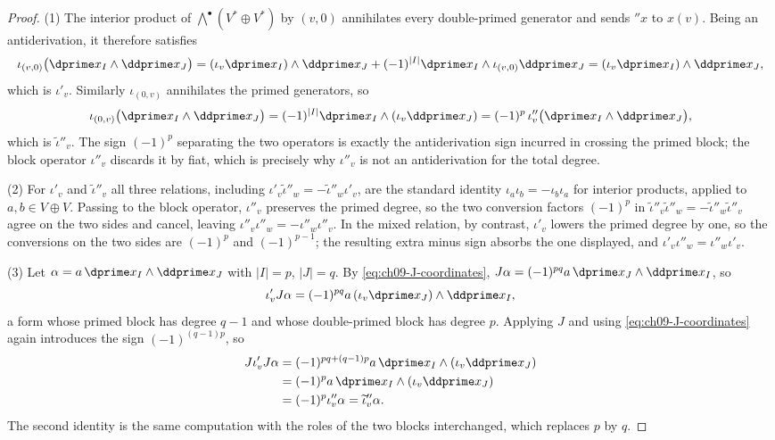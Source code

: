 \begin{proof}
(1)  The interior product of $\bigwedge^\bullet(V^*\oplus V^*)$ by
$(v,0)$ annihilates every double-primed generator and sends
$\dprime x$ to $x(v)$.  Being an antiderivation, it therefore satisfies
\[
 \iota_{(v,0)}\bigl(\dprime x_I\wedge\ddprime x_J\bigr)
 =(\iota_v\dprime x_I)\wedge\ddprime x_J
  +(-1)^{|I|}\dprime x_I\wedge\iota_{(v,0)}\ddprime x_J
 =(\iota_v\dprime x_I)\wedge\ddprime x_J ,
\]
which is $\iota'_v$.  Similarly $\iota_{(0,v)}$ annihilates the primed
generators, so
\[
 \iota_{(0,v)}\bigl(\dprime x_I\wedge\ddprime x_J\bigr)
 =(-1)^{|I|}\dprime x_I\wedge(\iota_v\ddprime x_J)
 =(-1)^{p}\,\iota''_v\bigl(\dprime x_I\wedge\ddprime x_J\bigr),
\]
which is $\widetilde\iota''_v$.  The sign $(-1)^p$ separating the two
operators is exactly the antiderivation sign incurred in crossing the primed
block; the block operator $\iota''_v$ discards it by fiat, which is precisely
why $\iota''_v$ is not an antiderivation for the total degree.

(2) For $\iota'_v$ and $\widetilde\iota''_v$ all three relations, including
$\iota'_v\widetilde\iota''_w=-\widetilde\iota''_w\iota'_v$, are the standard
identity $\iota_a\iota_b=-\iota_b\iota_a$ for interior products, applied to
$a,b\in V\oplus V$.  Passing to the block operator, $\iota''_v$ preserves the
primed degree, so the two conversion factors $(-1)^p$ in
$\widetilde\iota''_v\widetilde\iota''_w=-\widetilde\iota''_w
\widetilde\iota''_v$ agree on the two sides and cancel, leaving
$\iota''_v\iota''_w=-\iota''_w\iota''_v$.  In the mixed relation, by
contrast, $\iota'_v$ lowers the primed degree by one, so the conversions on
the two sides are $(-1)^p$ and $(-1)^{p-1}$; the resulting extra minus sign
absorbs the one displayed, and $\iota'_v\iota''_w=\iota''_w\iota'_v$.

(3) Let $\alpha=a\,\dprime x_I\wedge\ddprime x_J$ with $|I|=p$, $|J|=q$.
By \eqref{eq:ch09-J-coordinates},
$J\alpha=(-1)^{pq}a\,\dprime x_J\wedge\ddprime x_I$, so
\[
 \iota'_vJ\alpha
 =(-1)^{pq}a\,(\iota_v\dprime x_J)\wedge\ddprime x_I ,
\]
a form whose primed block has degree $q-1$ and whose double-primed block has
degree $p$.  Applying $J$ and using \eqref{eq:ch09-J-coordinates} again
introduces the sign $(-1)^{(q-1)p}$, so
\[
 \begin{aligned}
 J\iota'_vJ\alpha
  &=(-1)^{pq+(q-1)p}a\,\dprime x_I\wedge(\iota_v\ddprime x_J)\\
  &=(-1)^{p}a\,\dprime x_I\wedge(\iota_v\ddprime x_J)\\
  &=(-1)^p\iota''_v\alpha
   =\widetilde\iota''_v\alpha .
 \end{aligned}
\]
The second identity is the same computation with the roles of the two blocks
interchanged, which replaces $p$ by $q$.
\end{proof}

